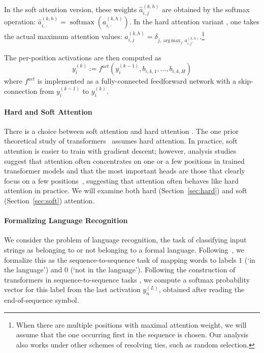 \documentclass[11pt,a4paper]{article}
\DeclareMathOperator*{\argmax}{arg\,max}
\begin{document}
In the soft attention version, these weights $\hat{a}_{i,j}^{(k,h)}$ are obtained by the softmax operation: $\hat{a}_{i,\cdot}^{(k,h)} = \operatorname{softmax}(a_{i,\cdot}^{(k,h)})$.
In the hard attention variant \cite{perez2019turing}, one takes the actual maximum attention values:
$\hat{a}_{i,j}^{(k,h)} = \delta_{j, \argmax_{j'} a_{i,j'}^{(k,h)}}$.\footnote{When there are multiple positions with maximal attention weight, we will assume that the one occurring first in the sequence is chosen. Our analysis also works under other schemes of resolving ties, such as random selection.}

The  per-position activations are then computed as
\begin{equation}
    y_i^{(k)} := f^{act}(y_i^{(k-1)}, b_{i,k,1}, \dots, b_{i,k,H})
\end{equation}
where $f^{act}$ is implemented as a fully-connected feedforward network with a skip-connection \cite{vaswani2017attention} from $y_i^{(k-1)}$ to $y_i^{(k)}$.


\paragraph{Hard and Soft Attention}
There is a choice between soft attention and hard attention \cite{shen2018reinforced,perez2019turing}.
The one prior theoretical study of transformers~\cite{perez2019turing} assumes hard attention.
In practice, soft attention is easier to train with gradient descent; however, analysis studies suggest that attention often concentrates on one or a few positions in trained transformer models \cite{voita2019analyzing,clark2019bert} and that the most important heads are those that clearly focus on a few positions~\cite{voita2019analyzing}, suggesting that attention often behaves  like hard attention in practice. 
We will  examine both hard (Section~\ref{sec:hard}) and soft (Section~\ref{sec:soft}) attention.


\paragraph{Formalizing Language Recognition}
We consider the problem of language recognition, the task of classifying input strings as belonging to or not belonging to a formal language.
Following~\citet{weiss2018practical}, we formalize this as the sequence-to-sequence task of mapping words to labels $1$ (`in the language') and $0$ (`not in the language').
Following the construction of transformers in sequence-to-sequence tasks \cite{vaswani2017attention}, we compute a softmax probability vector for this label from the last activation $y_{n}^{(L)}$, obtained after reading the end-of-sequence symbol.
\end{document}
